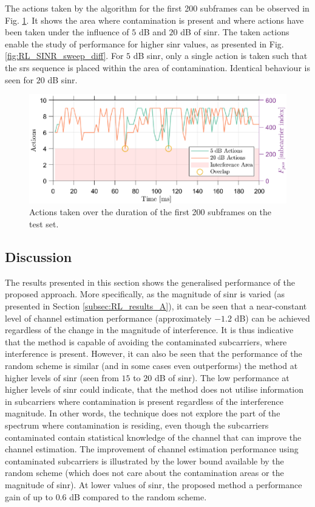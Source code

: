 The actions taken by the algorithm for the first 200 subframes can be observed in Fig. \ref{fig:RL_action_timeseries}. It shows the area where contamination is present and where actions have been taken under the influence of $5$ dB and $20$ dB of \gls{sinr}. The taken actions enable the study of performance for higher \gls{sinr} values, as presented in Fig. \ref{fig:RL_SINR_sweep_diff}. For $5$ dB \gls{sinr}, only a single action is taken such that the \gls{srs} sequence is placed within the area of contamination. Identical behaviour is seen for $20$ dB \gls{sinr}.


\begin{figure}
    \centering
    \includegraphics{chapters/part_uplink/figures/results/action_timeseries.eps}
    \caption{Actions taken over the duration of the first 200 subframes on the test set.}
    \label{fig:RL_action_timeseries}
\end{figure}



\subsection{Discussion}\label{sec:RL_discussion}
The results presented in this section shows the generalised performance of the proposed approach. More specifically, as the magnitude of \gls{sinr} is varied (as presented in Section \ref{subsec:RL_results_A}), it can be seen that a near-constant level of channel estimation performance (approximately $-1.2$ dB) can be achieved regardless of the change in the magnitude of interference. It is thus indicative that the method is capable of avoiding the contaminated subcarriers, where interference is present. However, it can also be seen that the performance of the random scheme is similar (and in some cases even outperforms) the method at higher levels of \gls{sinr} (seen from $15$ to $20$ dB of \gls{sinr}). The low performance at higher levels of \gls{sinr} could indicate, that the method does not utilise information in subcarriers where contamination is present regardless of the interference magnitude. In other words, the technique does not explore the part of the spectrum where contamination is residing, even though the subcarriers contaminated contain statistical knowledge of the channel that can improve the channel estimation. The improvement of channel estimation performance using contaminated subcarriers is illustrated by the lower bound available by the random scheme (which does not care about the contamination areas or the magnitude of \gls{sinr}). At lower values of \gls{sinr}, the proposed method a performance gain of up to $0.6$ dB compared to the random scheme. 

